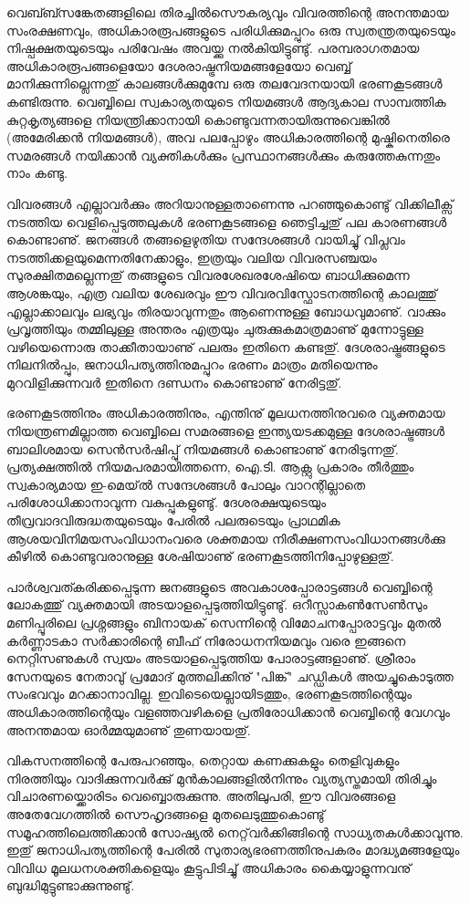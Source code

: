 വെബ്ബ്സങ്കേതങ്ങളിലെ തിരച്ചില്‍സൌകര്യവും വിവരത്തിന്റെ അനന്തമായ സംരക്ഷണവും, അധികാരരൂപങ്ങളുടെ പരിധിക്കുമപ്പുറം
 ഒരു സ്വതന്ത്രതയുടെയും നിഷ്പക്ഷതയുടെയും പരിവേഷം അവയ്ക്കു നല്‍കിയിട്ടുണ്ടു്. പരമ്പരാഗതമായ അധികാരരൂപങ്ങളെയോ 
ദേശരാഷ്ട്രനിയമങ്ങളേയോ വെബ്ബ് മാനിക്കുന്നില്ലെന്നതു് കാലങ്ങള്‍ക്കുമുമ്പേ ഒരു തലവേദനയായി ഭരണകൂടങ്ങള്‍ 
കണ്ടിരുന്നു. വെബ്ബിലെ സ്വകാര്യതയുടെ നിയമങ്ങള്‍ ആദ്യകാല സാമ്പത്തിക കുറ്റകൃത്യങ്ങളെ നിയന്ത്രിക്കാനായി 
കൊണ്ടുവന്നതായിരുന്നുവെങ്കില്‍ (അമേരിക്കന്‍ നിയമങ്ങള്‍), അവ പലപ്പോഴും അധികാരത്തിന്റെ മുഷ്കിനെതിരെ സമരങ്ങള്‍ 
നയിക്കാന്‍ വ്യക്തികള്‍ക്കും പ്രസ്ഥാനങ്ങള്‍ക്കും കരുത്തേകുന്നതും നാം കണ്ടു.

വിവരങ്ങള്‍ എല്ലാവര്‍ക്കും അറിയാനുള്ളതാണെന്നു പറഞ്ഞുകൊണ്ടു് വിക്കിലീക്സ് നടത്തിയ വെളിപ്പെടുത്തലുകള്‍ ഭരണകൂടങ്ങളെ 
ഞെട്ടിച്ചതു് പല കാരണങ്ങള്‍ കൊണ്ടാണു്. ജനങ്ങള്‍ തങ്ങളെഴുതിയ സന്ദേശങ്ങള്‍ വായിച്ചു് വിപ്ലവം നടത്തിക്കളയുമെന്നതിനേക്കാളും,
 ഇത്രയും വലിയ വിവരസഞ്ചയം സുരക്ഷിതമല്ലെന്നതു് തങ്ങളുടെ വിവരശേഖരശേഷിയെ ബാധിക്കുമെന്ന ആശങ്കയും, എത്ര വലിയ 
ശേഖരവും ഈ വിവരവിസ്ഫോടനത്തിന്റെ കാലത്തു് എല്ലാക്കാലവും ലഭ്യവും തിരയാവുന്നതും ആണെന്നുള്ള ബോധവുമാണു്. വാക്കും
 പ്രവൃത്തിയും തമ്മിലുള്ള അന്തരം എത്രയും ചുരുക്കുകമാത്രമാണു് മുന്നോട്ടുള്ള വഴിയെന്നൊരു താക്കീതായാണു് പലരും ഇതിനെ 
കണ്ടതു്. ദേശരാഷ്ട്രങ്ങളുടെ നിലനില്‍പ്പും, ജനാധിപത്യത്തിനുമപ്പുറം ഭരണം മാത്രം മതിയെന്നും മുറവിളിക്കുന്നവര്‍ ഇതിനെ ദണ്ഡനം 
കൊണ്ടാണു് നേരിട്ടതു്.

ഭരണകൂടത്തിനും അധികാരത്തിനും, എന്തിനു് മൂലധനത്തിനുവരെ വ്യക്തമായ നിയന്ത്രണമില്ലാത്ത വെബ്ബിലെ സമരങ്ങളെ 
ഇന്ത്യയടക്കമുള്ള ദേശരാഷ്ട്രങ്ങള്‍ ബാലിശമായ സെന്‍സര്‍ഷിപ്പു് നിയമങ്ങള്‍ കൊണ്ടാണു് നേരിടുന്നതു്. പ്രത്യക്ഷത്തില്‍ 
നിയമപരമായിത്തന്നെ, ഐ.ടി. ആക്റ്റു പ്രകാരം തീര്‍ത്തും സ്വകാര്യമായ ഇ-മെയ്ല്‍ സന്ദേശങ്ങള്‍ പോലും വാറന്റില്ലാതെ 
പരിശോധിക്കാനാവുന്ന വകുപ്പുകളുണ്ടു്. ദേശരക്ഷയുടെയും തീവ്രവാദവിരുദ്ധതയുടെയും പേരില്‍ പലരുടെയും പ്രാഥമിക 
ആശയവിനിമയസംവിധാനംവരെ ശക്തമായ നിരീക്ഷണസംവിധാനങ്ങള്‍ക്കു കീഴില്‍ കൊണ്ടുവരാനുള്ള ശേഷിയാണു് 
ഭരണകൂടത്തിനിപ്പോഴുള്ളതു്.

പാര്‍ശ്വവത്കരിക്കപ്പെടുന്ന ജനങ്ങളുടെ അവകാശപ്പോരാട്ടങ്ങള്‍ വെബ്ബിന്റെ ലോകത്തു് വ്യക്തമായി അടയാളപ്പെടുത്തിയിട്ടുണ്ടു്. 
ഒറീസ്സാകണ്‍സേണ്‍സും മണിപ്പൂരിലെ പ്രശ്നങ്ങളും ബിനായക് സെന്നിന്റെ വിമോചനപ്പോരാട്ടവും മുതല്‍ കര്‍ണ്ണാടകാ 
സര്‍ക്കാരിന്റെ ബീഫ് നിരോധനനിയമവും വരെ ഇങ്ങനെ നെറ്റിസണുകള്‍ സ്വയം അടയാളപ്പെടുത്തിയ പോരാട്ടങ്ങളാണു്. 
ശ്രീരാം സേനയുടെ നേതാവു് പ്രമോദ് മുത്തലിക്കിനു് "പിങ്ക്" ചഡ്ഡികള്‍ അയച്ചുകൊടുത്ത സംഭവവും മറക്കാനാവില്ല. 
ഇവിടെയെല്ലായിടത്തും, ഭരണകൂടത്തിന്റെയും അധികാരത്തിന്റെയും വളഞ്ഞവഴികളെ പ്രതിരോധിക്കാന്‍ വെബ്ബിന്റെ വേഗവും 
അനന്തമായ ഓര്‍മ്മയുമാണു് തുണയായതു്.

വികസനത്തിന്റെ പേരുപറഞ്ഞും, തെറ്റായ കണക്കുകളും തെളിവുകളും നിരത്തിയും വാദിക്കുന്നവര്‍ക്കു് മുന്‍കാലങ്ങളില്‍നിന്നും 
വ്യത്യസ്തമായി തിരിച്ചും വിചാരണയ്ക്കൊരിടം വെബ്ബൊരുക്കുന്നു. അതിലുപരി, ഈ വിവരങ്ങളെ അതേവേഗത്തില്‍ സൌഹൃദങ്ങളെ
 മുതലെടുത്തുകൊണ്ടു് സമൂഹത്തിലെത്തിക്കാന്‍ സോഷ്യല്‍ നെറ്റ്‌വര്‍ക്കിങ്ങിന്റെ സാധ്യതകള്‍ക്കാവുന്നു. ഇതു് ജനാധിപത്യത്തിന്റെ 
പേരില്‍ സുതാര്യഭരണത്തിനുപകരം മാദ്ധ്യമങ്ങളേയും വിവിധ മൂലധനശക്തികളെയും കൂട്ടുപിടിച്ചു് അധികാരം കൈയ്യാളുന്നവനു് 
ബുദ്ധിമുട്ടുണ്ടാക്കുന്നുണ്ടു്.


